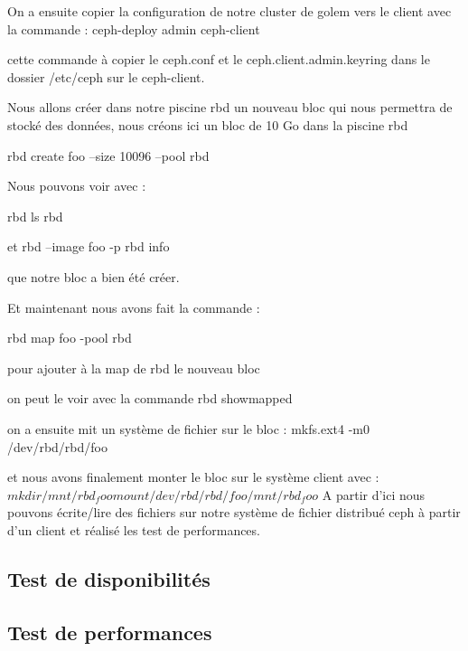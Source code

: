 \documentclass{article}
\begin{document}
On a ensuite copier la configuration de notre cluster de golem vers le client avec la commande : 
ceph-deploy admin ceph-client

cette commande à copier le ceph.conf et le ceph.client.admin.keyring dans le dossier /etc/ceph sur le ceph-client.

Nous allons créer dans notre piscine rbd un nouveau bloc qui nous permettra de stocké des données, nous créons ici un bloc de 10 Go dans la piscine rbd

rbd create foo --size 10096 --pool rbd

Nous pouvons voir avec : 

rbd ls rbd 

et 
rbd --image foo -p rbd info 

que notre bloc a bien été créer.

Et maintenant nous avons fait la commande :

rbd map foo -pool rbd

pour ajouter à la map de rbd le nouveau bloc

on peut le voir avec la commande rbd showmapped

on a ensuite mit un système de fichier sur le bloc :
mkfs.ext4 -m0 /dev/rbd/rbd/foo

et nous avons finalement monter le bloc sur le système client avec :
$mkdir /mnt/rbd_foo
mount /dev/rbd/rbd/foo /mnt/rbd_foo
$
A partir d'ici nous pouvons écrite/lire des fichiers sur notre système de fichier distribué ceph à partir d'un client et réalisé les test de performances.


	\subsection{Test de disponibilités}
	\subsection{Test de performances}
	
	
  
\end{document}
